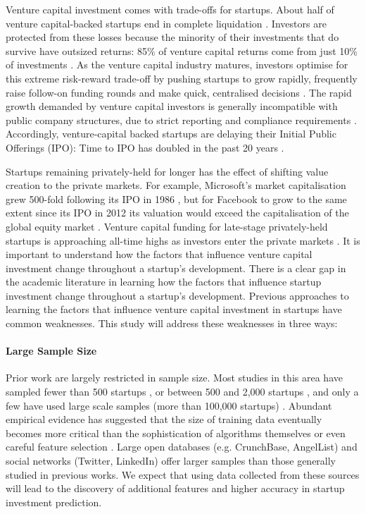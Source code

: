 \documentclass[../thesis/thesis.tex]{subfiles}
\begin{document}
Venture capital investment comes with trade-offs for startups. About half of venture capital-backed startups end in complete liquidation \cite{hall2010}. Investors are protected from these losses because the minority of their investments that do survive have outsized returns: 85\% of venture capital returns come from just 10\% of investments \cite{sahlman2010}. As the venture capital industry matures, investors optimise for this extreme risk-reward trade-off by pushing startups to grow rapidly, frequently raise follow-on funding rounds and make quick, centralised decisions \cite{fried2006}. The rapid growth demanded by venture capital investors is generally incompatible with public company structures, due to strict reporting and compliance requirements \cite{wies2015}. Accordingly, venture-capital backed startups are delaying their Initial Public Offerings (IPO): Time to IPO has doubled in the past 20 years \cite{nvca2016}.


Startups remaining privately-held for longer has the effect of shifting value creation to the private markets. For example, Microsoft's market capitalisation grew 500-fold following its IPO in 1986 \cite{mcnamara2011}, but for Facebook to grow to the same extent since its IPO in 2012 its valuation would exceed the capitalisation of the global equity market \cite{raice2012}. Venture capital funding for late-stage privately-held startups is approaching all-time highs as investors enter the private markets \cite{nvca2016}. It is important to understand how the factors that influence venture capital investment change throughout a startup's development. There is a clear gap in the academic literature in learning how the factors that influence startup investment change throughout a startup's development. Previous approaches to learning the factors that influence venture capital investment in startups have common weaknesses. This study will address these weaknesses in three ways:

\paragraph{Large Sample Size}

Prior work are largely restricted in sample size. Most studies in this area have sampled fewer than 500 startups \cite{ahlers2015, conti2013, gimmon2010, dixon2014}, or between 500 and 2,000 startups \cite{hoenen2014, yu2015, an2015, werth2013, croce2016}, and only a few have used large scale samples (more than 100,000 startups) \cite{shan2014, cheng2016}. Abundant empirical evidence has suggested that the size of training data eventually becomes more critical than the sophistication of algorithms themselves or even careful feature selection \cite{caruana2008}. Large open databases (e.g. CrunchBase, AngelList) and social networks (Twitter, LinkedIn) offer larger samples than those generally studied in previous works. We expect that using data collected from these sources will lead to the discovery of additional features and higher accuracy in startup investment prediction.
\end{document}
